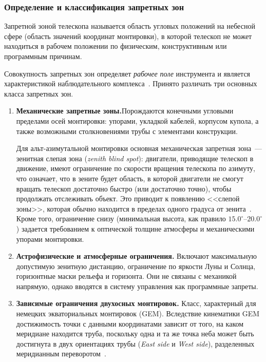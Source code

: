 \subsubsection{Определение и классификация запретных зон}
\label{subsec:forbidden_def}

Запретной зоной телескопа называется область угловых положений на небесной сфере (область значений координат монтировки), в которой телескоп не может находиться в рабочем положении по физическим, конструктивным или программным причинам.

Совокупность запретных зон определяет \textit{рабочее поле} инструмента и является характеристикой наблюдательного комплекса~\cite{ESO_Horizon}. Принято различать три основных класса запретных зон.

\begin{enumerate}
    \item \textbf{Механические запретные зоны.}Порождаются конечными угловыми пределами осей монтировки: упорами, укладкой кабелей, корпусом купола, а также возможными столкновениями трубы с элементами конструкции.
    
    Для альт-азимутальной монтировки основная механическая запретная зона~--- зенитная слепая зона (\textit{zenith blind spot}): двигатели, приводящие телескоп в движение, имеют ограничение по скорости вращения телескопа по азимуту, что означает, что в зените будет область, в которой двигатели не смогут вращать телескоп достаточно быстро (или достаточно точно), чтобы продолжать отслеживать объект. Это приводит к появлению <<слепой зоны>>, которая обычно находится в пределах одного градуса от зенита~\cite{TPoint_Wallace}. Кроме того, ограничение снизу (минимальная высота, как правило $15.0^\circ$--$20.0^\circ$) задается требованием к оптической толщине атмосферы и механическими упорами монтировки. 
    \item \textbf{Астрофизические и атмосферные ограничения.} Включают максимальную допустимую зенитную дистанцию, ограничение по яркости Луны и Солнца, горизонтные маски рельефа и горизонта. Они не связаны с механикой напрямую, однако вводятся в систему управления как программные запреты.
    \item \textbf{Зависимые ограничения двухосных монтировок.} Класс, характерный для немецких экваториальных монтировок (GEM). Вследствие кинематики GEM достижимость точки с данными координатами зависит от того, на каком меридиане находится труба, поскольку одна и та же точка неба может быть достигнута в двух ориентациях трубы (\textit{East side} и \textit{West side}), разделенных меридианным переворотом~\cite{ATUS_Stuttgart}\cite{EQMOD_Limits}.
\end{enumerate}

